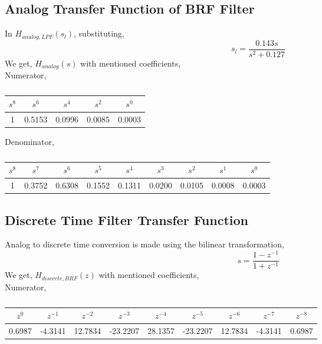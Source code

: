 \documentclass[12pt]{article}
\begin{document}
\subsection{Analog Transfer Function of BRF Filter}
In $H_{analog,LPF}(s_l)$, substituting,
\begin{equation}
    s_l = \frac{0.143s}{s^2+0.127}
\end{equation}
We get, $H_{analog}(s)$ with mentioned coefficients,\\
Numerator,


\begin{table}[H]
\centering  %
\begin{tabular}{|c|c|c|c|c|}
\hline  %
$s^8$ & $s^6$ & $s^4$ & $s^2$ & $s^0$ \\ \hline
1 & 0.5153 & 0.0996 & 0.0085 & 0.0003  \\
\hline    %
\end{tabular}
\caption{}
\end{table}




Denominator,
\begin{table}[H]
\centering  %
\begin{tabular}{|c|c|c|c|c|c|c|c|c|}
\hline  %
$s^8$ & $s^7$ & $s^6$ & $s^5$ & $s^4$ & $s^3$ & $s^2$ & $s^1$ & $s^0$ \\ \hline
1 & 0.3752 & 0.6308 & 0.1552 & 0.1311 & 0.0200 & 0.0105 & 0.0008 & 0.0003 \\
\hline    %
\end{tabular}
\caption{}
\end{table}

\newpage
\subsection{Discrete Time Filter Transfer Function}
Analog to discrete time conversion is made using the bilinear transformation,
\begin{equation}
    s = \frac{1-z^{-1}}{1+z^{-1}}
\end{equation}
We get, $H_{discrete,BRF}(z)$ with mentioned coefficients,\\

Numerator,
\begin{table}[H]
\centering  %
\begin{tabular}{|c|c|c|c|c|c|c|c|c|}
\hline  %
$z^0$ & $z^{-1}$ & $z^{-2}$ & $z^{-3}$ & $z^{-4}$ & $z^{-5}$ & $z^{-6}$ & $z^{-7}$ & $z^{-8}$ \\ \hline
0.6987 & -4.3141 & 12.7834 & -23.2207 & 28.1357 & -23.2207 & 12.7834 & -4.3141 & 0.6987 \\
\hline    %
\end{tabular}
\caption{}
\end{table}
\end{document}

